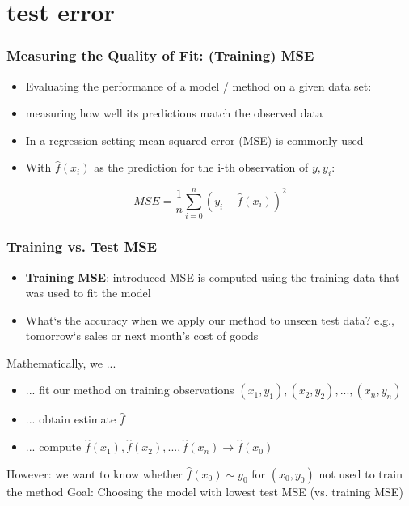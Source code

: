 \documentclass{beamer}
\begin{document}
\section{test error}
\begin{frame}
\frametitle{Measuring the Quality of Fit: (Training) MSE}
\begin{itemize}
\item Evaluating the performance of a model / method on a given data set:
\item measuring how well its predictions match the observed data
\end{itemize}

\bigskip
\begin{itemize}
\item In a regression setting mean squared error (MSE) is commonly used
\item With $\hat{f}(x_i)$ as the prediction for the i-th observation of $y, y_i$:
\end{itemize}
\begin{equation*}
MSE = \frac{1}{n}\sum_{i=0}^n (y_i- \hat{f}(x_i))^2
\end{equation*}
\end{frame}

\begin{frame}
\frametitle{ Training vs. Test MSE}
\begin{itemize}
\item \textbf{Training MSE}: introduced MSE is computed using the training data that was used to fit the model
\item What‘s the accuracy when we apply our method to unseen test data? e.g., tomorrow‘s sales or next month’s cost of goods
\end{itemize}
\bigskip
Mathematically, we ...
\begin{itemize}
\item ... fit our method on training observations ${(x_1 , y_1 ), (x_2 , y_2 ), . . . , (x_n , y_n )}$
\item ... obtain estimate $\hat{f}$
\item ... compute $\hat{f}(x_1) , \hat{f}(x_2) , ... , \hat{f}(x_n) \rightarrow \hat{f}(x_0)$ 
\end{itemize}
However: we want to know whether $\hat{f}(x_0) \sim y_0$ for $(x_0 , y_0 )$ not used to train the method
\newline
Goal: Choosing the model with lowest test MSE (vs. training MSE)
\end{frame}
\end{document}
